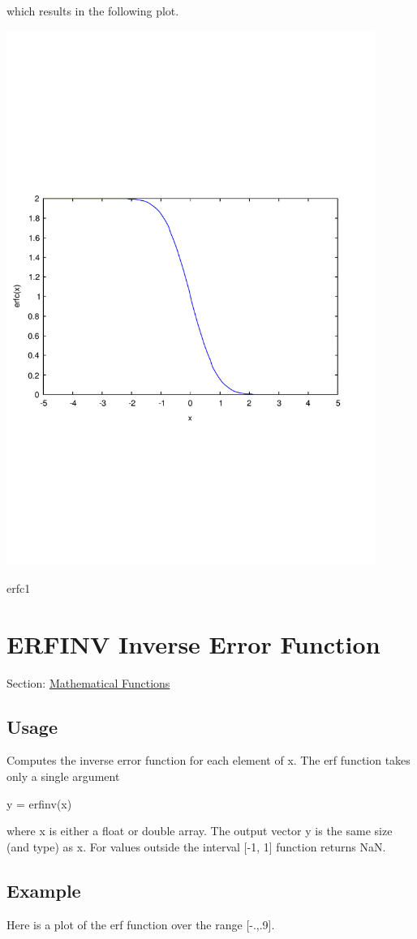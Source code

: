which results in the following plot.  
\begin{DoxyImage}
\includegraphics[width=12cm]{erfc1}
\caption{erfc1}
\end{DoxyImage}
 \hypertarget{mathfunctions_erfinv}{}\section{E\-R\-F\-I\-N\-V Inverse Error Function}\label{mathfunctions_erfinv}
Section\-: \hyperlink{sec_mathfunctions}{Mathematical Functions} \hypertarget{vtkwidgets_vtkxyplotwidget_Usage}{}\subsection{Usage}\label{vtkwidgets_vtkxyplotwidget_Usage}
Computes the inverse error function for each element of x. The {\ttfamily erf} function takes only a single argument \begin{DoxyVerb}  y = erfinv(x)
\end{DoxyVerb}
 where {\ttfamily x} is either a {\ttfamily float} or {\ttfamily double} array. The output vector {\ttfamily y} is the same size (and type) as {\ttfamily x}. For values outside the interval \mbox{[}-\/1, 1\mbox{]} function returns Na\-N. \hypertarget{variables_struct_Example}{}\subsection{Example}\label{variables_struct_Example}
Here is a plot of the erf function over the range {\ttfamily \mbox{[}-\/.,.9\mbox{]}}.


